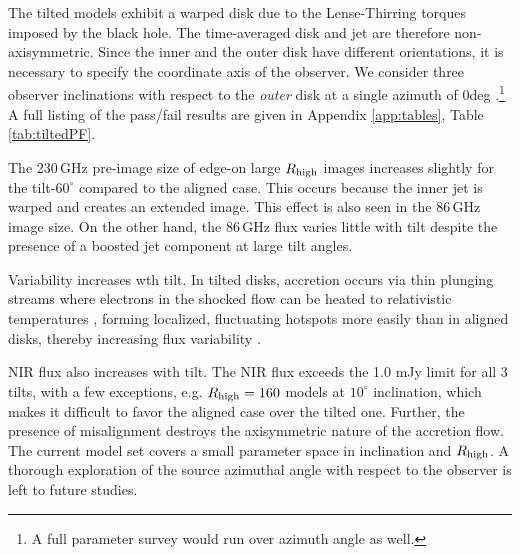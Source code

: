 The tilted models exhibit a warped disk due to the Lense-Thirring torques imposed by the black hole.  The time-averaged disk and jet are therefore non-axisymmetric.
Since the inner and the outer disk have different orientations, it is necessary to specify the coordinate axis of the observer.  We consider three  observer inclinations with respect to the {\em outer} disk at a single azimuth of $0$deg \citep[for more details, see][]{Chatterjee2020}.\footnote{A full parameter survey would run over azimuth angle as well.}  A full listing of the pass/fail results are given in Appendix \ref{app:tables}, Table \ref{tab:tiltedPF}.

The 230\,GHz pre-image size of edge-on large $R_{\rm high}$ images increases slightly for the tilt-$60^{\circ}$ compared to the aligned case. This occurs because the inner jet is warped and creates an extended image. This effect is also seen in the 86\,GHz image size. On the other hand, the 86\,GHz flux varies little with tilt despite the presence of a boosted jet component at large tilt angles.


Variability increases wth tilt. In tilted disks, accretion occurs via thin plunging streams \citep[e.g.,][]{Fragile2007} where electrons in the shocked flow can be heated to relativistic temperatures \citep[e.g.][]{Dexter2013}, forming localized, fluctuating hotspots more easily than in aligned disks, thereby increasing flux variability \citep{Chatterjee2020}.


NIR flux also increases with tilt.  The NIR flux exceeds the 1.0 mJy limit for all 3 tilts, with a few exceptions, e.g. $R_{\rm high}=160$ models at $10^{\circ}$ inclination, which makes it difficult to favor the aligned case over the tilted one. Further, the presence of misalignment destroys the axisymmetric nature of the accretion flow.  The current model set covers a small parameter space in inclination and $R_{\rm high}$.  A thorough exploration of the source azimuthal angle with respect to the observer is left to future studies.


